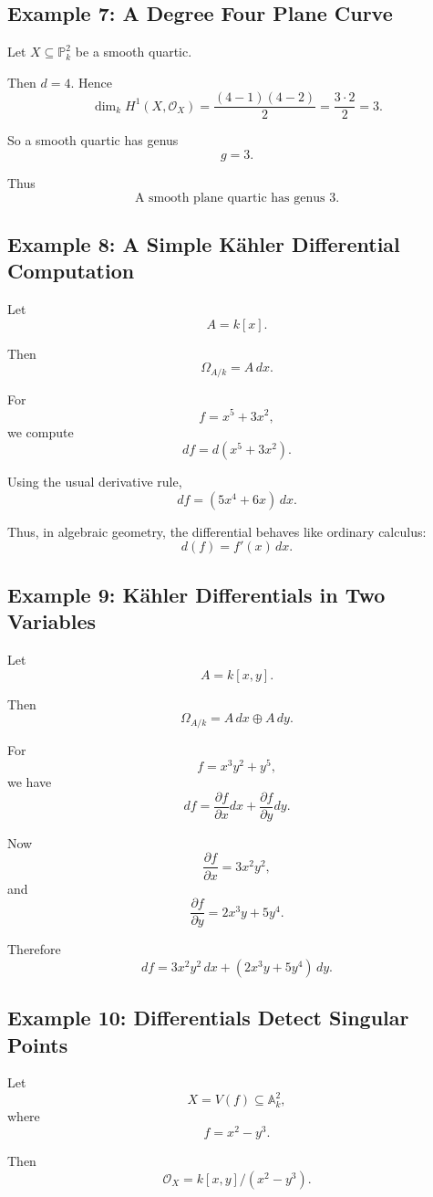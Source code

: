 \documentclass[12pt,a4paper]{article}
\theoremstyle{notespace}
\begin{document}
\subsection{Example 7: A Degree Four Plane Curve}

Let $X\subseteq\mathbb P_k^2$ be a smooth quartic.

Then $d=4$. Hence
\[
\dim_k H^1(X,\mathcal O_X)
=
\frac{(4-1)(4-2)}2
=
\frac{3\cdot2}{2}
=
3.
\]

So a smooth quartic has genus
\[
g=3.
\]

Thus
\[
\boxed{
	\text{A smooth plane quartic has genus }3.
}
\]

\subsection{Example 8: A Simple K\"ahler Differential Computation}

Let
\[
A=k[x].
\]

Then
\[
\Omega_{A/k}=A\,dx.
\]

For
\[
f=x^5+3x^2,
\]
we compute
\[
df=d(x^5+3x^2).
\]

Using the usual derivative rule,
\[
df=(5x^4+6x)\,dx.
\]

Thus, in algebraic geometry, the differential behaves like ordinary
calculus:
\[
\boxed{
	d(f)=f'(x)\,dx.
}
\]

\subsection{Example 9: K\"ahler Differentials in Two Variables}

Let
\[
A=k[x,y].
\]

Then
\[
\Omega_{A/k}=A\,dx\oplus A\,dy.
\]

For
\[
f=x^3y^2+y^5,
\]
we have
\[
df
=
\frac{\partial f}{\partial x}dx
+
\frac{\partial f}{\partial y}dy.
\]

Now
\[
\frac{\partial f}{\partial x}
=
3x^2y^2,
\]
and
\[
\frac{\partial f}{\partial y}
=
2x^3y+5y^4.
\]

Therefore
\[
\boxed{
	df=
	3x^2y^2\,dx
	+
	(2x^3y+5y^4)\,dy.
}
\]

\subsection{Example 10: Differentials Detect Singular Points}

Let
\[
X=V(f)\subseteq\mathbb A_k^2,
\]
where
\[
f=x^2-y^3.
\]

Then
\[
\mathcal O_X
=
k[x,y]/(x^2-y^3).
\]
\end{document}
